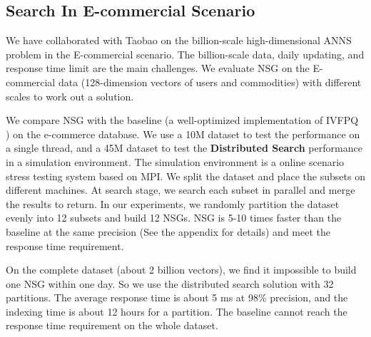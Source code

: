 \documentclass{vldb}
\begin{document}
\subsection{Search In E-commercial Scenario}
We have collaborated with Taobao on the billion-scale high-dimensional ANNS problem in the E-commercial scenario. The billion-scale data, daily updating, and response time limit are the main challenges. We evaluate NSG on the E-commercial data (128-dimension vectors of users and commodities) with different scales to work out a solution.

We compare NSG with the baseline (a well-optimized implementation of IVFPQ \cite{jegou2011product}) on the e-commerce database. We use a 10M dataset to test the performance on a single thread, and a 45M dataset to test the \textbf{Distributed Search} performance in a simulation environment. The simulation environment is a online scenario stress testing system based on MPI. We split the dataset and place the subsets on different machines. At search stage, we search each subset in parallel and merge the results to return. In our experiments, we randomly partition the dataset evenly into 12 subsets and build 12 NSGs. NSG is 5-10 times faster than the baseline at the same precision (See the appendix for details) and meet the response time requirement.

On the complete dataset (about 2 billion vectors), we find it impossible to build one NSG within one day. So we use the distributed search solution with 32 partitions. The average response time is about 5 ms at 98\% precision, and the indexing time is about 12 hours for a partition. The baseline cannot reach the response time requirement on the whole dataset. 
\end{document}
